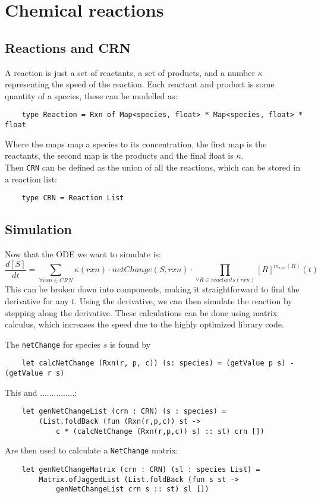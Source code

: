 \section{Chemical reactions}

\subsection{Reactions and CRN}
A reaction is just a set of reactants, a set of products, and a number $\kappa$ representing the speed of the reaction. Each reactant and product is some quantity of a species, these can be modelled as:  
\begin{verbatim}
    type Reaction = Rxn of Map<species, float> * Map<species, float> * float
\end{verbatim}
Where the maps map a species to its concentration, the first map is the reactants, the second map is the products and the final float is $\kappa$.\\

Then \texttt{CRN} can be defined as the union of all the reactions, which can be stored in a reaction list:
\begin{verbatim}
    type CRN = Reaction List
\end{verbatim}


\subsection{Simulation}
Now that the ODE we want to simulate is:
$$\frac{d[S]}{dt}=\sum_{\forall rxn \in CRN} \kappa(rxn)\cdot netChange(S,rxn)\cdot\prod_{\forall R \in reactants(rxn)} [R]^{m_{rxn}(R)}(t)$$
This can be broken down into components, making it straightforward to find the derivative for any $t$. Using the derivative, we can then simulate the reaction by stepping along the derivative. These calculations can be done using matrix calculus, which increases the speed due to the highly optimized library code.

The \texttt{netChange} for species $s$ is found by
\begin{verbatim}
    let calcNetChange (Rxn(r, p, c)) (s: species) = (getValue p s) - (getValue r s) 
\end{verbatim}

This and ...............:
\begin{verbatim}
    let genNetChangeList (crn : CRN) (s : species) = 
        (List.foldBack (fun (Rxn(r,p,c)) st -> 
            c * (calcNetChange (Rxn(r,p,c)) s) :: st) crn [])
\end{verbatim}
Are then used to calculate a \texttt{NetChange} matrix:
\begin{verbatim}
    let genNetChangeMatrix (crn : CRN) (sl : species List) = 
        Matrix.ofJaggedList (List.foldBack (fun s st -> 
            genNetChangeList crn s :: st) sl [])
\end{verbatim}


